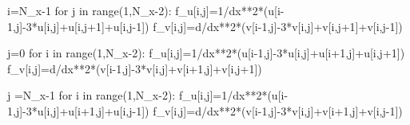\documentclass[
  letterpaper,
  DIV=11,
  numbers=noendperiod]{scrreprt}
\newenvironment{Shaded}{\begin{snugshade}}{\end{snugshade}}
\newcommand{\BuiltInTok}[1]{\textcolor[rgb]{0.00,0.23,0.31}{#1}}
\newcommand{\ControlFlowTok}[1]{\textcolor[rgb]{0.00,0.23,0.31}{#1}}
\newcommand{\DecValTok}[1]{\textcolor[rgb]{0.68,0.00,0.00}{#1}}
\newcommand{\KeywordTok}[1]{\textcolor[rgb]{0.00,0.23,0.31}{#1}}
\newcommand{\NormalTok}[1]{\textcolor[rgb]{0.00,0.23,0.31}{#1}}
\newcommand{\OperatorTok}[1]{\textcolor[rgb]{0.37,0.37,0.37}{#1}}
\theoremstyle{plain}
\theoremstyle{definition}
\theoremstyle{plain}
\theoremstyle{remark}
\begin{document}
\begin{Shaded}
\begin{Highlighting}[]
\NormalTok{    i}\OperatorTok{=}\NormalTok{N\_x}\OperatorTok{{-}}\DecValTok{1}
    \ControlFlowTok{for}\NormalTok{ j }\KeywordTok{in} \BuiltInTok{range}\NormalTok{(}\DecValTok{1}\NormalTok{,N\_x}\OperatorTok{{-}}\DecValTok{2}\NormalTok{):}
\NormalTok{      f\_u[i,j]}\OperatorTok{=}\DecValTok{1}\OperatorTok{/}\NormalTok{dx}\OperatorTok{**}\DecValTok{2}\OperatorTok{*}\NormalTok{(u[i}\OperatorTok{{-}}\DecValTok{1}\NormalTok{,j]}\OperatorTok{{-}}\DecValTok{3}\OperatorTok{*}\NormalTok{u[i,j]}\OperatorTok{+}\NormalTok{u[i,j}\OperatorTok{+}\DecValTok{1}\NormalTok{]}\OperatorTok{+}\NormalTok{u[i,j}\OperatorTok{{-}}\DecValTok{1}\NormalTok{]) }
\NormalTok{      f\_v[i,j]}\OperatorTok{=}\NormalTok{d}\OperatorTok{/}\NormalTok{dx}\OperatorTok{**}\DecValTok{2}\OperatorTok{*}\NormalTok{(v[i}\OperatorTok{{-}}\DecValTok{1}\NormalTok{,j]}\OperatorTok{{-}}\DecValTok{3}\OperatorTok{*}\NormalTok{v[i,j]}\OperatorTok{+}\NormalTok{v[i,j}\OperatorTok{+}\DecValTok{1}\NormalTok{]}\OperatorTok{+}\NormalTok{v[i,j}\OperatorTok{{-}}\DecValTok{1}\NormalTok{])   }

\NormalTok{    j}\OperatorTok{=}\DecValTok{0}
    \ControlFlowTok{for}\NormalTok{ i }\KeywordTok{in} \BuiltInTok{range}\NormalTok{(}\DecValTok{1}\NormalTok{,N\_x}\OperatorTok{{-}}\DecValTok{2}\NormalTok{):}
\NormalTok{        f\_u[i,j]}\OperatorTok{=}\DecValTok{1}\OperatorTok{/}\NormalTok{dx}\OperatorTok{**}\DecValTok{2}\OperatorTok{*}\NormalTok{(u[i}\OperatorTok{{-}}\DecValTok{1}\NormalTok{,j]}\OperatorTok{{-}}\DecValTok{3}\OperatorTok{*}\NormalTok{u[i,j]}\OperatorTok{+}\NormalTok{u[i}\OperatorTok{+}\DecValTok{1}\NormalTok{,j]}\OperatorTok{+}\NormalTok{u[i,j}\OperatorTok{+}\DecValTok{1}\NormalTok{]) }
\NormalTok{        f\_v[i,j]}\OperatorTok{=}\NormalTok{d}\OperatorTok{/}\NormalTok{dx}\OperatorTok{**}\DecValTok{2}\OperatorTok{*}\NormalTok{(v[i}\OperatorTok{{-}}\DecValTok{1}\NormalTok{,j]}\OperatorTok{{-}}\DecValTok{3}\OperatorTok{*}\NormalTok{v[i,j]}\OperatorTok{+}\NormalTok{v[i}\OperatorTok{+}\DecValTok{1}\NormalTok{,j]}\OperatorTok{+}\NormalTok{v[i,j}\OperatorTok{+}\DecValTok{1}\NormalTok{]) }

\NormalTok{    j }\OperatorTok{=}\NormalTok{N\_x}\OperatorTok{{-}}\DecValTok{1}
    \ControlFlowTok{for}\NormalTok{ i }\KeywordTok{in} \BuiltInTok{range}\NormalTok{(}\DecValTok{1}\NormalTok{,N\_x}\OperatorTok{{-}}\DecValTok{2}\NormalTok{):}
\NormalTok{        f\_u[i,j]}\OperatorTok{=}\DecValTok{1}\OperatorTok{/}\NormalTok{dx}\OperatorTok{**}\DecValTok{2}\OperatorTok{*}\NormalTok{(u[i}\OperatorTok{{-}}\DecValTok{1}\NormalTok{,j]}\OperatorTok{{-}}\DecValTok{3}\OperatorTok{*}\NormalTok{u[i,j]}\OperatorTok{+}\NormalTok{u[i}\OperatorTok{+}\DecValTok{1}\NormalTok{,j]}\OperatorTok{+}\NormalTok{u[i,j}\OperatorTok{{-}}\DecValTok{1}\NormalTok{]) }
\NormalTok{        f\_v[i,j]}\OperatorTok{=}\NormalTok{d}\OperatorTok{/}\NormalTok{dx}\OperatorTok{**}\DecValTok{2}\OperatorTok{*}\NormalTok{(v[i}\OperatorTok{{-}}\DecValTok{1}\NormalTok{,j]}\OperatorTok{{-}}\DecValTok{3}\OperatorTok{*}\NormalTok{v[i,j]}\OperatorTok{+}\NormalTok{v[i}\OperatorTok{+}\DecValTok{1}\NormalTok{,j]}\OperatorTok{+}\NormalTok{v[i,j}\OperatorTok{{-}}\DecValTok{1}\NormalTok{])  }


\end{Highlighting}
\end{Shaded}
\end{document}
